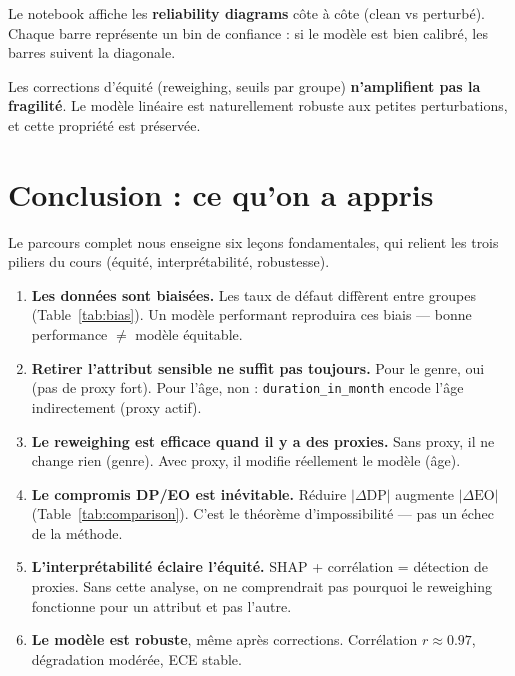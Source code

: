 \documentclass[11pt, a4paper]{article}
\begin{document}
Le notebook affiche les \textbf{reliability diagrams} c\^{o}te \`{a} c\^{o}te (clean vs perturb\'{e}). Chaque barre repr\'{e}sente un bin de confiance : si le mod\`{e}le est bien calibr\'{e}, les barres suivent la diagonale.

\begin{leconbox}[Le\c{c}on]
Les corrections d'\'{e}quit\'{e} (reweighing, seuils par groupe) \textbf{n'amplifient pas la fragilit\'{e}}. Le mod\`{e}le lin\'{e}aire est naturellement robuste aux petites perturbations, et cette propri\'{e}t\'{e} est pr\'{e}serv\'{e}e.
\end{leconbox}

\section{Conclusion : ce qu'on a appris}
\label{sec:conclusion}

\begin{questionbox}
Le parcours complet nous enseigne six le\c{c}ons fondamentales, qui relient les trois piliers du cours (\'{e}quit\'{e}, interpr\'{e}tabilit\'{e}, robustesse).
\end{questionbox}

\begin{enumerate}[leftmargin=2em, itemsep=0.5em]
    \item \textbf{Les donn\'{e}es sont biais\'{e}es.} Les taux de d\'{e}faut diff\`{e}rent entre groupes (Table~\ref{tab:bias}). Un mod\`{e}le performant reproduira ces biais --- bonne performance $\neq$ mod\`{e}le \'{e}quitable.

    \item \textbf{Retirer l'attribut sensible ne suffit pas toujours.} Pour le genre, oui (pas de proxy fort). Pour l'\^{a}ge, non : \texttt{duration\_in\_month} encode l'\^{a}ge indirectement (proxy actif).

    \item \textbf{Le reweighing est efficace quand il y a des proxies.} Sans proxy, il ne change rien (genre). Avec proxy, il modifie r\'{e}ellement le mod\`{e}le (\^{a}ge).

    \item \textbf{Le compromis DP/EO est in\'{e}vitable.} R\'{e}duire $|\Delta\text{DP}|$ augmente $|\Delta\text{EO}|$ (Table~\ref{tab:comparison}). C'est le th\'{e}or\`{e}me d'impossibilit\'{e} --- pas un \'{e}chec de la m\'{e}thode.

    \item \textbf{L'interpr\'{e}tabilit\'{e} \'{e}claire l'\'{e}quit\'{e}.} SHAP + corr\'{e}lation = d\'{e}tection de proxies. Sans cette analyse, on ne comprendrait pas pourquoi le reweighing fonctionne pour un attribut et pas l'autre.

    \item \textbf{Le mod\`{e}le est robuste}, m\^{e}me apr\`{e}s corrections. Corr\'{e}lation $r \approx 0.97$, d\'{e}gradation mod\'{e}r\'{e}e, ECE stable.
\end{enumerate}
\end{document}
